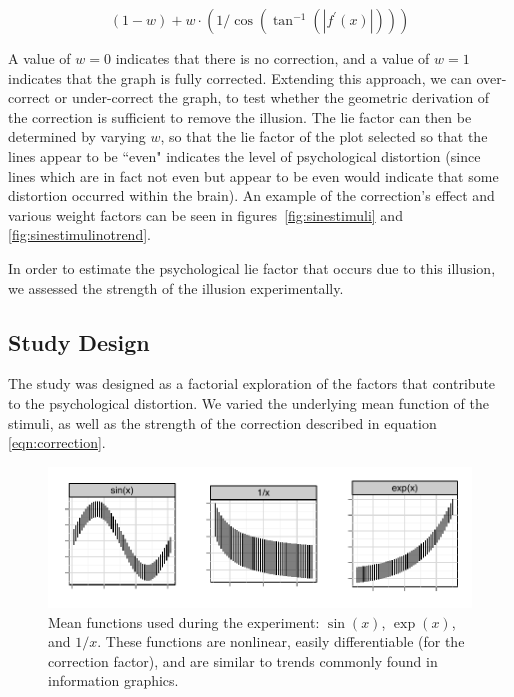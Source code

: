 \documentclass[11pt]{isuthesis}\usepackage[]{graphicx}\usepackage[]{color}
\newcommand{\comment}[2][inline]{\todo[color=SkyBlue, #1]{#2}} %
\begin{document}
\begin{equation}\label{eqn:correction}
(1-w) + w \cdot \left(1 / \cos\left(\tan^{-1}(|f^\prime(x)|)\right)\right)
\end{equation}

A value of $w=0$ indicates that there is no correction, and a value of $w=1$ indicates that the graph is fully corrected.
Extending this approach, we can over-correct or under-correct the graph, to test whether the geometric derivation of the correction is sufficient to remove the illusion. The lie factor can then be determined by varying $w$, so that the lie factor of the plot selected so that the lines appear to be ``even" indicates the level of psychological distortion (since lines which are in fact not even but appear to be even would indicate that some distortion occurred within the brain). An example of the correction's effect and various weight factors can be seen in figures~\ref{fig:sinestimuli} and \ref{fig:sinestimulinotrend}. 


In order to estimate the psychological lie factor that occurs due to this illusion, we assessed the strength of the illusion experimentally. 

\subsection{Study Design}
The study was designed as a factorial exploration of the factors that contribute to the psychological distortion. We varied the underlying mean function of the stimuli, as well as the strength of the correction described in equation \ref{eqn:correction}.


\begin{figure}
\centering
\includegraphics[width=.8\linewidth]{fig-exampleUncorrected}
\caption[Mean functions used in the experiment]{Mean functions used during the experiment: $\sin(x)$, $\exp(x)$, and $1/x$. These functions are nonlinear, easily differentiable (for the correction factor), and are similar to trends commonly found in information graphics.\label{fig:uncorrectedExamples}}
\end{figure}
\end{document}
